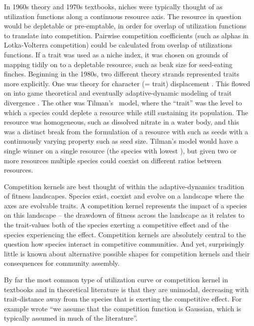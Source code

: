 \documentclass[a4paper,11pt]{article}
\begin{document}
In 1960s theory and 1970s textbooks, niches were typically thought of as utilization functions along a continuous resource axis. The resource in question would be depletable or pre-emptable, in order for overlap of utilization functions to translate into competition. Pairwise competition coefficients (such as alphas in Lotka-Volterra competition) could be calculated from overlap of utilizations functions. If a trait was used as a niche index, it was chosen on grounds of mapping tidily on to a depletable resource, such as beak size for seed-eating finches. Beginning in the 1980s, two different theory strands represented traits more explicitly. One was theory for character (= trait) displacement \citep[e.g.,][]{Taper-1985, Case-2000, Goldberg-2006}. This flowed on into game theoretical and eventually adaptive-dynamic modeling of trait divergence \citep{Brown-1987,Geritz-1998,Geritz-1999,Dieckmann-1999,Abrams-2001}. The other was Tilman's \citeyear{Tilman-1982} \Rstar\ model, where the ``trait'' was the level to which a species could deplete a resource while still sustaining its population. The resource was homogeneous, such as dissolved nitrate in a water body, and this was a distinct break from the formulation of a resource with such as seeds with a continuously varying property such as seed size. Tilman's \citeyear{Tilman-1982} model would have a single winner on a single resource (the species with lowest \Rstar), but given two or more resources multiple species could coexist on different ratios between resources.

Competition kernels are best thought of within the adaptive-dynamics tradition of fitness landscapes. Species exist, coexist and evolve on a landscape where the axes are evolvable traits. A competition kernel represents the impact of a species on this landscape -- the drawdown of fitness across the landscape as it relates to the trait-values both of the species exerting a competitive effect and of the species experiencing the effect. Competition kernels are absolutely central to the question how species interact in competitive communities. And yet, surprisingly little is known about alternative possible shapes for competition kernels and their consequences for community assembly.

By far the most common type of utilization curve or competition kernel in textbooks
and in theoretical literature is that they are unimodal, decreasing with trait-distance away from the species that is exerting the competitive effect. For example \citep{Birand-2014} wrote ``we assume that the competition function is Gaussian, which is typically assumed in much of the literature''.
\end{document}
